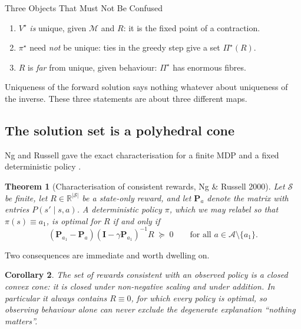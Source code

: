 \documentclass[11pt]{article}
\theoremstyle{plain}
\newtheorem{theorem}{Theorem}[section]
\newtheorem{corollary}[theorem]{Corollary}
\theoremstyle{definition}
\theoremstyle{remark}
\renewcommand{\S}{\mathcal{S}}
\newcommand{\A}{\mathcal{A}}
\newcommand{\R}{\mathbb{R}}
\begin{document}
\begin{graybox}{Three Objects That Must Not Be Confused}
\begin{enumerate}
\item $V^\star$ \emph{is} unique, given $\mathcal{M}$ and $R$: it is the
fixed point of a contraction.
\item $\pi^\star$ need \emph{not} be unique: ties in the greedy step give a
set $\Pi^\star(R)$.
\item $R$ is \emph{far} from unique, given behaviour: $\Pi^\star$ has
enormous fibres.
\end{enumerate}
Uniqueness of the forward solution says nothing whatever about uniqueness
of the inverse. These three statements are about three different maps.
\end{graybox}

\subsection{The solution set is a polyhedral cone}

Ng and Russell gave the exact characterisation for a finite MDP and a
fixed deterministic policy \cite{ngrussell2000}.

\begin{theorem}[Characterisation of consistent rewards, Ng \& Russell
2000]\label{thm:ngrussell}
Let $\S$ be finite, let $R\in\R^{|\S|}$ be a state-only reward, and let
$\mathbf{P}_a$ denote the matrix with entries $P(s'\mid s,a)$. A
deterministic policy $\pi$, which we may relabel so that $\pi(s)\equiv
a_1$, is optimal for $R$ if and only if
\begin{equation}
(\mathbf{P}_{a_1}-\mathbf{P}_a)(\mathbf{I}-\gamma\mathbf{P}_{a_1})^{-1}R \;\succeq\; 0
\qquad \text{for all } a\in\A\setminus\{a_1\}.
\label{eq:ngrussell}
\end{equation}
\end{theorem}

Two consequences are immediate and worth dwelling on.

\begin{corollary}\label{cor:cone}
The set of rewards consistent with an observed policy is a closed
\emph{convex cone}: it is closed under non-negative scaling and under
addition. In particular it always contains $R\equiv0$, for which every
policy is optimal, so observing behaviour alone can never exclude the
degenerate explanation ``nothing matters''.
\end{corollary}
\end{document}
